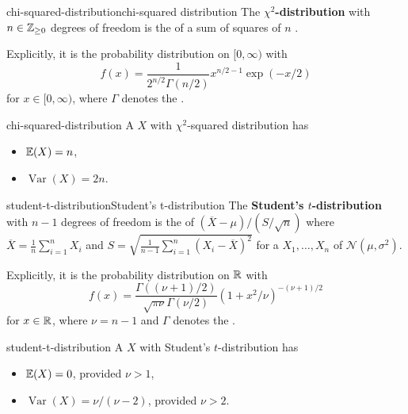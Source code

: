 \begin{topic}{chi-squared-distribution}{chi-squared distribution}
    The \textbf{$\chi^2$-distribution} with $n \in \mathbb{Z}_{\ge 0}$ degrees of freedom is the  of a sum of squares of $n$  .
    
    Explicitly, it is the probability distribution on $[0, \infty)$ with 
    \[ f(x) = \frac{1}{2^{n / 2} \Gamma(n / 2)} x^{n / 2 - 1} \exp(-x / 2) \]
    for $x \in [0, \infty)$, where $\Gamma$ denotes the .
\end{topic}

\begin{example}{chi-squared-distribution}
    A  $X$ with $\chi^2$-squared distribution has
    \begin{itemize}
        \item {} $\mathbb{E}(X) = n$,
        \item {} $\operatorname{Var}(X) = 2n$.
    \end{itemize}
\end{example}

\begin{topic}{student-t-distribution}{Student's t-distribution}
    The \textbf{Student's $t$-distribution} with $n - 1$ degrees of freedom is the  of $(\overline{X} - \mu) / (S / \sqrt{n})$ where $\overline{X} = \frac{1}{n} \sum_{i = 1}^{n} X_i$ and $S = \sqrt{\frac{1}{n - 1} \sum_{i = 1}^{n} (X_i - \overline{X})^2}$ for a  $X_1, \ldots, X_n$ of  $\mathcal{N}(\mu, \sigma^2)$.
    
    Explicitly, it is the probability distribution on $\mathbb{R}$ with 
    \[ f(x) = \frac{\Gamma((\nu + 1) / 2)}{\sqrt{\pi \nu} \Gamma(\nu / 2)} (1 + x^2 / \nu)^{-(\nu + 1) / 2} \]
    for $x \in \mathbb{R}$, where $\nu = n - 1$ and $\Gamma$ denotes the .
\end{topic}

\begin{example}{student-t-distribution}
    A  $X$ with Student's $t$-distribution has
    \begin{itemize}
        \item {} $\mathbb{E}(X) = 0$, provided $\nu > 1$,
        \item {} $\operatorname{Var}(X) = \nu / (\nu - 2)$, provided $\nu > 2$.
    \end{itemize}
\end{example}

